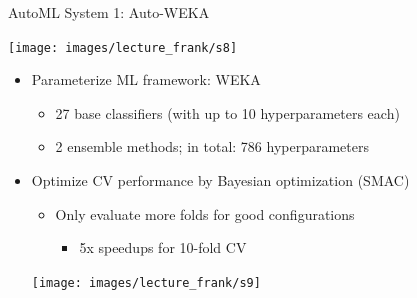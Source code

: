 \begin{frame}[c]{AutoML System 1: Auto-WEKA}

{\centering
	\texttt{[image: images/lecture\_frank/s8]}
}
\begin{itemize}
	\item P\alert{arameterize ML framework: WEKA} 
	\begin{itemize}
		\item 27 base classifiers (with up to 10 hyperparameters each)
		\item 2 ensemble methods; in total: 786 hyperparameters
	\end{itemize}
	\item Optimize \alert{CV performance} by Bayesian optimization (SMAC)
	\begin{minipage}{0.675\textwidth}
		\begin{itemize}
			\item Only evaluate more folds for good configurations
			\begin{itemize}
				\item 5x speedups for 10-fold CV
			\end{itemize}
		\end{itemize}
	\end{minipage}%
	\begin{minipage}{0.26\textwidth}
{\centering
	\texttt{[image: images/lecture\_frank/s9]}
}
	\end{minipage}
\end{itemize}
\end{frame}
